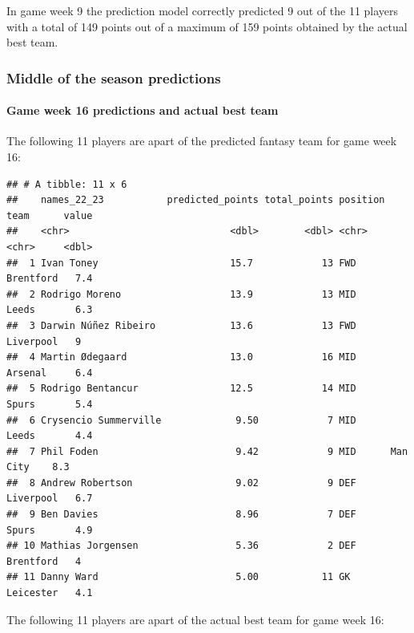 \documentclass[11pt,preprint, authoryear]{elsarticle}
\numberwithin{equation}{section}
\numberwithin{figure}{section}
\numberwithin{table}{section}
\begin{document}
In game week 9 the prediction model correctly predicted 9 out of the 11
players with a total of 149 points out of a maximum of 159 points
obtained by the actual best team.

\hypertarget{middle-of-the-season-predictions}{%
\subsubsection{Middle of the season
predictions}\label{middle-of-the-season-predictions}}

\hypertarget{game-week-16-predictions-and-actual-best-team}{%
\paragraph{Game week 16 predictions and actual best
team}\label{game-week-16-predictions-and-actual-best-team}}

The following 11 players are apart of the predicted fantasy team for
game week 16:

\begin{verbatim}
## # A tibble: 11 x 6
##    names_22_23           predicted_points total_points position team      value
##    <chr>                            <dbl>        <dbl> <chr>    <chr>     <dbl>
##  1 Ivan Toney                       15.7            13 FWD      Brentford   7.4
##  2 Rodrigo Moreno                   13.9            13 MID      Leeds       6.3
##  3 Darwin Núñez Ribeiro             13.6            13 FWD      Liverpool   9  
##  4 Martin Ødegaard                  13.0            16 MID      Arsenal     6.4
##  5 Rodrigo Bentancur                12.5            14 MID      Spurs       5.4
##  6 Crysencio Summerville             9.50            7 MID      Leeds       4.4
##  7 Phil Foden                        9.42            9 MID      Man City    8.3
##  8 Andrew Robertson                  9.02            9 DEF      Liverpool   6.7
##  9 Ben Davies                        8.96            7 DEF      Spurs       4.9
## 10 Mathias Jorgensen                 5.36            2 DEF      Brentford   4  
## 11 Danny Ward                        5.00           11 GK       Leicester   4.1
\end{verbatim}

The following 11 players are apart of the actual best team for game week
16:
\end{document}
